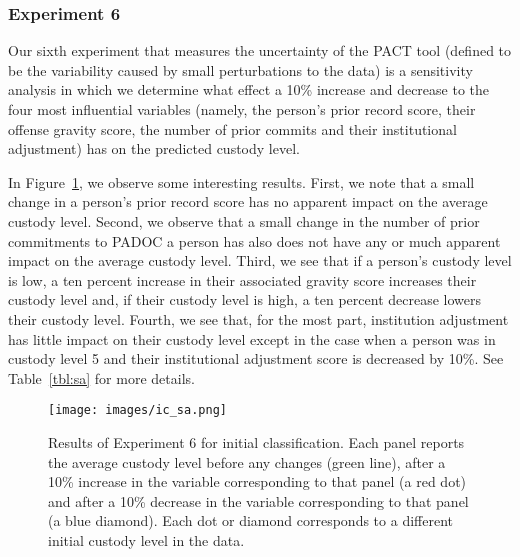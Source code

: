 \documentclass{amsproc}
\numberwithin{equation}{section}
\theoremstyle{plain}
\theoremstyle{remark}
\begin{document}
\subsubsection{Experiment 6}  Our sixth experiment that measures the uncertainty of the PACT tool (defined to be the variability caused by small perturbations to the data) is a sensitivity analysis in which we determine what effect a 10\% increase and decrease to the four most influential variables (namely, the person's prior record score, their offense gravity score, the number of prior commits and their institutional adjustment) has on the predicted custody level.  

In Figure~\ref{fig:ic_sa}, we observe some interesting results.  First, we note that a small change in a person's prior record score has no apparent impact on the average custody level.  Second, we observe that a small change in the number of prior commitments to PADOC a person has also does not have any or much apparent impact on the average custody level.  Third, we see that if a person's custody level is low, a ten percent increase in their associated gravity score increases their custody level and, if their custody level is high, a ten percent decrease lowers their custody level.  Fourth, we see that, for the most part, institution adjustment has little impact on their custody level except in the case when a person was in custody level 5 and their institutional adjustment score is decreased by 10\%.  See Table~\ref{tbl:sa} for more details.

\begin{figure}
\centering
\texttt{[image: images/ic\_sa.png]}
\caption{Results of Experiment 6 for initial classification.  Each panel reports the average custody level before any changes (green line), after a 10\% increase in the variable corresponding to that panel (a red dot) and after a 10\% decrease in the variable corresponding to that panel (a blue diamond).  Each dot or diamond corresponds to a different initial custody level in the data.}\label{fig:ic_sa}
\end{figure}
\end{document}
